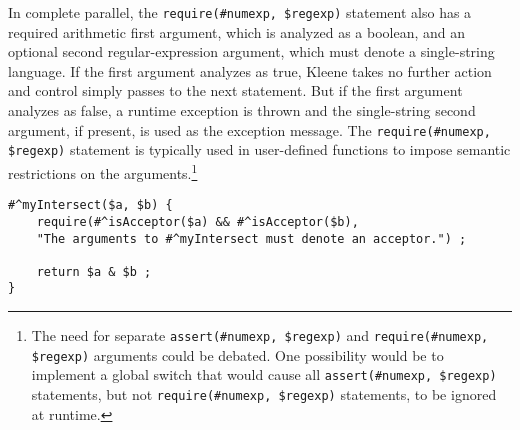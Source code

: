 In complete parallel, the \verb!require(#numexp, $regexp)! statement also has a required arithmetic first
argument, which is analyzed as a boolean, and an optional second
regular-expression argument, which must denote a single-string language.  If
the first argument analyzes as true, Kleene takes no further action and control simply passes to the next
statement.  But if the first argument analyzes as false, a runtime exception is thrown and
the single-string second argument, if present, is used as the exception
message.  The \verb!require(#numexp, $regexp)! statement is typically used
in user-defined functions to impose semantic restrictions on the
arguments.\footnote{The need for separate \verb!assert(#numexp, $regexp)!
and \verb!require(#numexp, $regexp)! arguments could be debated.  One
possibility would be to implement a global switch that would cause all
\verb!assert(#numexp, $regexp)! statements, but not 
\verb!require(#numexp, $regexp)! statements, to be ignored at runtime.}

\begin{Verbatim}[fontsize=\small]
#^myIntersect($a, $b) {
	require(#^isAcceptor($a) && #^isAcceptor($b), 
    "The arguments to #^myIntersect must denote an acceptor.") ;

	return $a & $b ;
}
\end{Verbatim}


